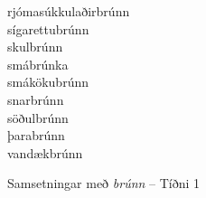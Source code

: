 \documentclass[../samsetningasafn.tex]{subfiles}
\begin{document}
\begin{bigwordlist}
\begin{footnotesize}
\begin{multicols}{4}
\begin{description}
		\item [rjómasúkkulaðirbrúnn]
		\item [sígarettubrúnn]
		\item [skulbrúnn]
		\item [smábrúnka]
		\item [smákökubrúnn]
		\item [snarbrúnn]
		\item [söðulbrúnn]
		\item [þarabrúnn]
		\item [vandækbrúnn]
	\end{description}
\end{multicols}
\end{footnotesize}

\label{listi:blar1}
\caption{Samsetningar með \textit{brúnn} -- Tíðni 1}
\end{bigwordlist}
\end{document}

